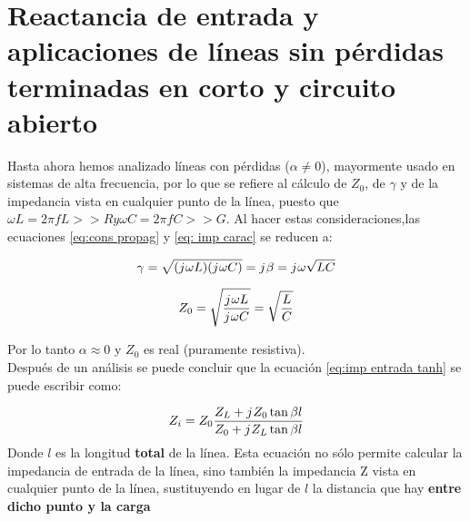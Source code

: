 \documentclass[
	12pt, %
	fleqn, %
	a4paper, %
	oneside, %
]{LegrandOrangeBook}
\begin{document}
\section{Reactancia de entrada y aplicaciones de líneas sin pérdidas terminadas en corto y circuito abierto}
Hasta ahora hemos analizado líneas con pérdidas ($\alpha\neq0$), mayormente usado en sistemas de alta frecuencia, por lo que se refiere al cálculo de $Z_0$, de $\gamma$ y de la impedancia vista en cualquier punto de la línea, puesto que $\omega L= 2\pi fL >> R y \omega C =2\pi f C >> G$. Al hacer estas consideraciones,las ecuaciones \ref{eq:cons propag} y \ref{eq: imp carac} se reducen a:
\begin{corollary}
\begin{equation}
\gamma=\sqrt{({j\mkern1mu}\omega L)({j\mkern1mu}\omega C)}={j\mkern1mu}\beta={j\mkern1mu}\omega\sqrt{LC}
\label{eq:cons propa sin perdidas}
\end{equation}
\end{corollary}
\begin{corollary}
\begin{equation}
Z_0=\sqrt{\frac{{j\mkern1mu}\omega L}{{j\mkern1mu}\omega C}}=\sqrt{\frac{L}{C}}
\label{eq:imp carac sin perdidas}
\end{equation}
\end{corollary}
Por lo tanto $\alpha\approx 0$ y $Z_0$ es real (puramente resistiva).\\
Después de un análisis se puede concluir que la ecuación \ref{eq:imp entrada tanh} se puede escribir como:
\begin{corollary}
\begin{equation}
Z_i=Z_0\frac{Z_L+{j\mkern1mu} Z_0\tan\beta l}{Z_0+{j\mkern1mu} Z_L\tan\beta l}
\label{eq:imp entrada sin perdidas}
\end{equation}
Donde $l$ es la longitud \textbf{total} de la línea. Esta ecuación no sólo permite calcular la impedancia de entrada de la línea, sino también la impedancia Z vista en cualquier punto de la línea, sustituyendo en lugar de $l$ la distancia que hay \textbf{entre dicho punto y la carga}
\end{corollary}
\end{document}
